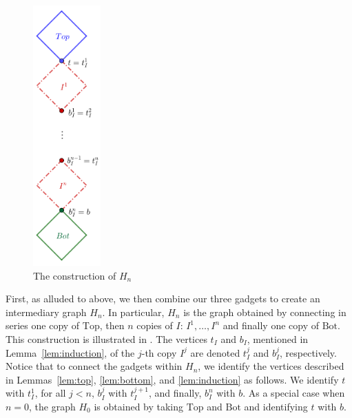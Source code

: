 \documentclass[11pt,letter]{article}
\theoremstyle{remark}
\newcommand{\T}{\text{Top}}
\newcommand{\B}{\text{Bot}}
\begin{document}
\begin{figure}[h!]
    \centering
    \includegraphics[height=10cm]{ConstructionHn.png}
    \caption{The construction of $H_n$}\label{fig:Hn}
\end{figure}

First, as alluded to above, we then combine our three gadgets to create an intermediary graph $H_n$. In particular, $H_n$ is the graph obtained by connecting in series one copy of $\T$,
then $n$ copies of $I$: $I^1, \dots, I^n$ and finally one copy of $\B$.  
This construction is illustrated in .
The vertices $t_I$ and $b_I$, mentioned in Lemma~\ref{lem:induction}, of the $j$-th copy $I^j$ are denoted $t^j_I$ and $b^j_I$, respectively.
Notice that to connect the gadgets within $H_n$, we identify the vertices described in Lemmas~\ref{lem:top}, \ref{lem:bottom}, and \ref{lem:induction} as follows. We identify $t$ with $t^1_I$, for all $j < n$, $b^j_I$ with $t^{j+1}_I$, and finally, $b^n_I$ with $b$. As a special case when $n = 0$, the graph $H_0$ is obtained by taking $\T$ and $\B$ and identifying $t$ with $b$.
\end{document}
